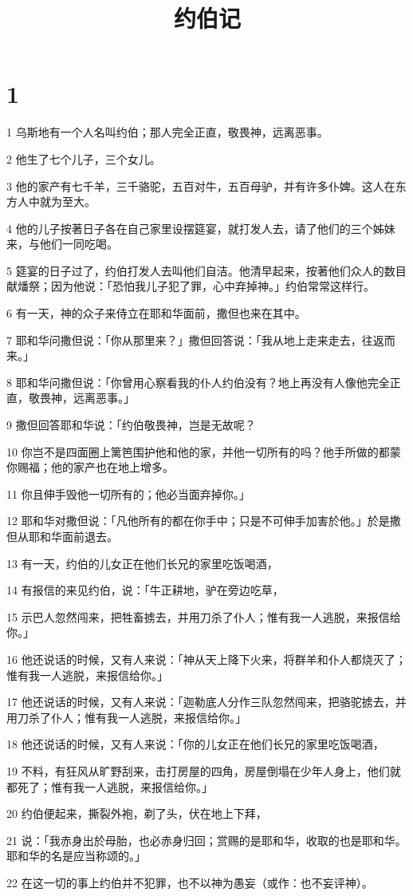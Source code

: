 

\title{约伯记}


\chapter{1}

\par 1 乌斯地有一个人名叫约伯；那人完全正直，敬畏神，远离恶事。
\par 2 他生了七个儿子，三个女儿。
\par 3 他的家产有七千羊，三千骆驼，五百对牛，五百母驴，并有许多仆婢。这人在东方人中就为至大。
\par 4 他的儿子按著日子各在自己家里设摆筵宴，就打发人去，请了他们的三个姊妹来，与他们一同吃喝。
\par 5 筵宴的日子过了，约伯打发人去叫他们自洁。他清早起来，按著他们众人的数目献燔祭；因为他说：「恐怕我儿子犯了罪，心中弃掉神。」约伯常常这样行。
\par 6 有一天，神的众子来侍立在耶和华面前，撒但也来在其中。
\par 7 耶和华问撒但说：「你从那里来？」撒但回答说：「我从地上走来走去，往返而来。」
\par 8 耶和华问撒但说：「你曾用心察看我的仆人约伯没有？地上再没有人像他完全正直，敬畏神，远离恶事。」
\par 9 撒但回答耶和华说：「约伯敬畏神，岂是无故呢？
\par 10 你岂不是四面圈上篱笆围护他和他的家，并他一切所有的吗？他手所做的都蒙你赐福；他的家产也在地上增多。
\par 11 你且伸手毁他一切所有的；他必当面弃掉你。」
\par 12 耶和华对撒但说：「凡他所有的都在你手中；只是不可伸手加害於他。」於是撒但从耶和华面前退去。
\par 13 有一天，约伯的儿女正在他们长兄的家里吃饭喝酒，
\par 14 有报信的来见约伯，说：「牛正耕地，驴在旁边吃草，
\par 15 示巴人忽然闯来，把牲畜掳去，并用刀杀了仆人；惟有我一人逃脱，来报信给你。」
\par 16 他还说话的时候，又有人来说：「神从天上降下火来，将群羊和仆人都烧灭了；惟有我一人逃脱，来报信给你。」
\par 17 他还说话的时候，又有人来说：「迦勒底人分作三队忽然闯来，把骆驼掳去，并用刀杀了仆人；惟有我一人逃脱，来报信给你。」
\par 18 他还说话的时候，又有人来说：「你的儿女正在他们长兄的家里吃饭喝酒，
\par 19 不料，有狂风从旷野刮来，击打房屋的四角，房屋倒塌在少年人身上，他们就都死了；惟有我一人逃脱，来报信给你。」
\par 20 约伯便起来，撕裂外袍，剃了头，伏在地上下拜，
\par 21 说：「我赤身出於母胎，也必赤身归回；赏赐的是耶和华，收取的也是耶和华。耶和华的名是应当称颂的。」
\par 22 在这一切的事上约伯并不犯罪，也不以神为愚妄（或作：也不妄评神）。

